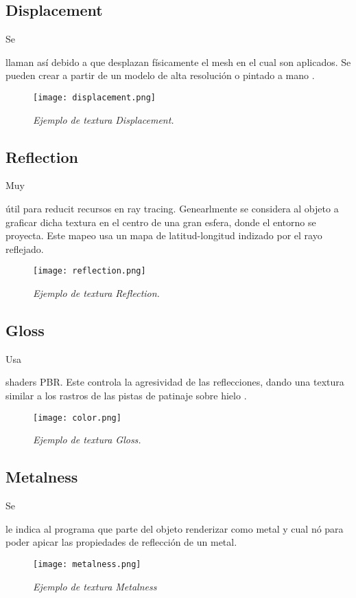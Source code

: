 \documentclass[stu, 12pt, letterpaper, donotrepeattitle, floatsintext, natbib]{apa7}
\begin{document}
    \subsection{Displacement}
    Se \begin{justifying}
      llaman así debido a que desplazan físicamente el mesh en el cual son aplicados. Se pueden crear a partir de un modelo de alta resolución
    o pintado a mano \citep{pluralsight-2014}.\par
    \end{justifying}
    \begin{figure}[H]
      \caption{\emph{Ejemplo de textura Displacement.}}
      \centering
      \texttt{[image: displacement.png]}
      \bigskip
    \end{figure}
    \subsection{Reflection}
    Muy \begin{justifying}
      útil para reducit recursos en ray tracing. Genearlmente se considera al objeto a graficar dicha textura en el centro de una gran esfera, donde 
      el entorno se proyecta. Este mapeo usa un mapa de latitud-longitud indizado por el rayo reflejado.
    \end{justifying}
    \begin{figure}[H]
      \caption{\emph{Ejemplo de textura Reflection.}}
      \centering
      \texttt{[image: reflection.png]}
      \bigskip
    \end{figure}
    \subsection{Gloss}
    Usa \begin{justifying}
      shaders PBR. Este controla la agresividad de las reflecciones, dando una textura similar a los rastros de las pistas de patinaje sobre hielo \citep{unknown-author-no-date}.\par
    \end{justifying}
    \begin{figure}[H]
      \caption{\emph{Ejemplo de textura Gloss.}}
      \centering
      \texttt{[image: color.png]}
      \bigskip
    \end{figure}
    \subsection{Metalness}
    Se \begin{justifying}
      le indica al programa que parte del objeto renderizar como metal y cual nó para poder apicar las propiedades de reflección
      de un metal.\par
    \end{justifying}
    \begin{figure}[H]
      \caption{\emph{Ejemplo de textura Metalness}}
      \centering
      \texttt{[image: metalness.png]}
      \bigskip
    \end{figure}
\end{document}

